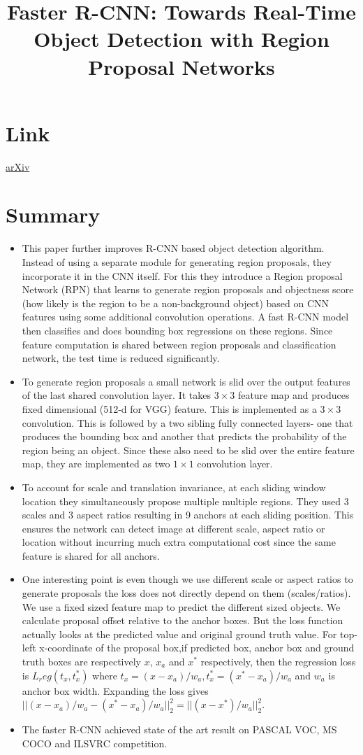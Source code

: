 \documentclass{article}
\title{Faster R-CNN: Towards Real-Time Object Detection with Region Proposal Networks}
\author{}
\date{}
\begin{document}
\maketitle

\section*{Link}
\href{https://arxiv.org/abs/1506.01497}{arXiv} 

\section*{Summary}
\begin{itemize}
    \item This paper further improves R-CNN based object detection algorithm. Instead of using a separate module for generating region proposals, they incorporate it in the CNN itself. For this they introduce a Region proposal Network (RPN) that learns to generate region proposals and objectness score (how likely is the region to be a non-background object) based on CNN features using some additional convolution operations. A fast R-CNN model then classifies and does bounding box regressions on these regions. Since feature computation is shared between region proposals and classification network, the test time is reduced significantly. 
    \item To generate region proposals a small network is slid over the output features of the last shared convolution layer. It takes $3\times 3$ feature map and produces fixed dimensional (512-d for VGG) feature. This is implemented as a $3\times 3$ convolution. This is followed by a two sibling fully connected layers- one that produces the bounding box and another that predicts the probability of the region being an object. Since these also need to be slid over the entire feature map, they are implemented as two $1\times 1$ convolution layer.
    \item To account for scale and translation invariance, at each sliding window location they simultaneously propose multiple multiple regions. They used 3 scales and 3 aspect ratios resulting in 9 anchors at each sliding position. This ensures the network can detect image at different scale, aspect ratio or location without incurring much extra computational cost since the same feature is shared for all anchors.
    \item One interesting point is even though we use different scale or aspect ratios to generate proposals the loss does not directly depend on them (scales/ratios). We use a fixed sized feature map to predict the different sized objects. We calculate proposal offset relative to the anchor boxes. But the loss function actually looks at the predicted value and original ground truth value. For top-left x-coordinate of the proposal box,if predicted box, anchor box and ground truth boxes are respectively $x$, $x_a$ and $x^*$ respectively, then the regression loss is $L_reg(t_x, t_x^*)$ where $t_x = (x-x_a)/w_a, t_x^*=(x^*-x_a)/w_a$ and $w_a$ is anchor box width. Expanding the loss gives $||(x-x_a)/w_a -(x^*-x_a)/w_a||_2^2 = ||(x-x^*)/w_a||_2^2$.
    \item The faster R-CNN achieved state of the art result on PASCAL VOC, MS COCO and ILSVRC competition. 
\end{itemize}
\end{document}
